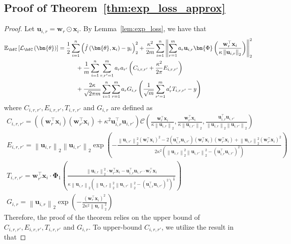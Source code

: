 \documentclass[10pt]{article} %
\theoremstyle{definition}
\theoremstyle{plain}
\newcommand{\paren}[1]{\left(#1\right)}
\newcommand{\norm}[1]{\left\|#1\right\|}
\providecommand{\E}{\mathbb{E}}
\def\calL{{\mathcal{L}}}
\def\bfu{{\mathbf{u}}}\def\bfv{{\mathbf{v}}}\def\bfw{{\mathbf{w}}}\def\bfx{{\mathbf{x}}}
\begin{document}
\subsection{Proof of Theorem~\ref{thm:exp_loss_approx}}
\label{sec:proof_exp_loss}
\begin{proof}
    Let $\bfu_{i,r} = \bfw_r\odot\bfx_i$. By Lemma~\ref{lem:exp_loss}, we have that
    \begin{align*}
        \E_{\bfC}\left[\calL_{\bfC}\paren{\bm{\theta}}\right] & = \frac{1}{2}\sum_{i=1}^n\paren{\hat{f}\paren{\bm{\theta},\bfx_i}-y_i}_2^2 + \frac{\kappa^2}{2m}\sum_{i=1}^n\norm{\sum_{r=1}^ma_r\bfu_{i,r}\bm{\Phi}\paren{\frac{\bfw_r^\top\bfx_i}{\kappa\norm{\bfu_{i,r}}_2}}}_2^2\\
        & \quad\quad\quad + \frac{1}{m}\sum_{i=1}^n\sum_{r,r'=1}^ma_ra_{r'}\paren{C_{i,r,r'} + \frac{\kappa^2}{2\pi}E_{i,r,r'}}\\
        & \quad\quad\quad + \frac{2\kappa}{\sqrt{2\pi m}}\sum_{i=1}^n\sum_{r=1}^ma_rG_{i,r}\paren{\frac{1}{\sqrt{m}}\sum_{r'=1}^ma_r'T_{i,r,r'} - y}
    \end{align*}
    where $C_{i,r,r'}, E_{i,r,r'}, T_{i,r,r'}$ and $G_{i,r}$ are defined as
    \begin{gather*}
        C_{i,r,r'} = \paren{\paren{\bfw_r^\top\bfx_i}\paren{\bfw_{r'}^\top\bfx_i} + \kappa^2\bfu_{i,r}^\top\bfu_{i,r'}}\mathcal{C}\paren{\frac{\bfw_r^\top\bfx_i}{\kappa\norm{\bfu_{i,r}}_2},\frac{\bfw_{r'}^\top\bfx_i}{\kappa\norm{\bfu_{i,r'}}_2},\frac{\bfu_{i,r}^\top\bfu_{i,r'}}{\norm{\bfu_{i,r}}_2\norm{\bfu_{i,r'}}_2}}\\
        E_{i,r,r'} = \norm{\bfu_{i,r}}_2\norm{\bfu_{i,r'}}_2\exp\paren{-\frac{\norm{\bfu_{i,r'}}_2^2\paren{\bfw_r^\top\bfx_i}^2-2\paren{\bfu_{i,r}^\top\bfu_{i,r'}}\paren{\bfw_r^\top\bfx_i}\paren{\bfw_{r'}^\top\bfx_i} + \norm{\bfu_{i,r}}_2^2\paren{\bfw_{r'}^\top\bfx_i}^2}{2\kappa^2\paren{\norm{\bfu_{i,r}}_2^2\norm{\bfu_{i,r'}}_2^2-\paren{\bfu_{i,r}^\top\bfu_{i,r'}}^2}}}\\
        T_{i,r,r'} = \bfw_{r'}^\top\bfx_i\cdot \bm{\Phi}_1\paren{\frac{\norm{\bfu_{i,r}}_2^2\cdot\bfw_{r'}^\top\bfx_i-\bfu_{i,r}^\top\bfu_{i,r'}\cdot\bfw_r^\top\bfx_i}{\kappa\norm{\bfu_{i,r}}_2\paren{\norm{\bfu_{i,r}}_2^2\norm{\bfu_{i,r'}}_2^2-\paren{\bfu_{i,r}^\top\bfu_{i,r'}}^2}^{\frac{1}{2}}}}\\
        G_{i,r} = \norm{\bfu_{i,r}}_2\exp\paren{-\frac{\paren{\bfw_r^\top\bfx_i}^2}{2\kappa^2\norm{\bfu_r}_2^2}}
    \end{gather*}
    Therefore, the proof of the theorem relies on the upper bound of $C_{i,r,r'}, E_{i,r,r'}, T_{i,r,r'}$ and $G_{i,r}$. To upper-bound $C_{i,r,r'}$, we utilize the result in \cite{} that

\end{proof}
\end{document}
